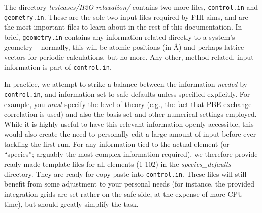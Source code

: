 The directory \emph{testcases/H2O-relaxation/} contains two more files,
\texttt{control.in} and \linebreak[4] \texttt{geometry.in}. These are the sole two input
files required by FHI-aims, and are the most important files to learn about in
the rest of this documentation. In brief, \texttt{geometry.in} contains any
information related directly to a system's geometry -- normally, this will be
atomic positions (in \AA) and perhaps lattice vectors for periodic
calculations, but no more. Any other, method-related, input information is
part of \texttt{control.in}. 

In practice, we attempt to strike a balance
between the information \emph{needed} by \linebreak[4] \texttt{control.in}, and information
set to safe defaults unless specified explicitly. For example, you \emph{must}
specify the level of theory (e.g., the fact that PBE exchange-correlation is
used) and also the basis set and other numerical settings employed. While it is highly useful to
have this relevant information openly accessible, this  
would also create the need to personally edit a large amount of input before ever
tackling the first run. For any information tied to the actual element (or
``species''; arguably the most complex information required), we therefore provide
ready-made template files for all elements (1-102) in the
\emph{species\_defaults} directory. They are ready for copy-paste into
\texttt{control.in}. These files will still benefit from some
adjustment to your personal needs (for instance, the provided integration
grids are set rather on the safe side, at the expense of more CPU time), but
should greatly simplify the task. 

